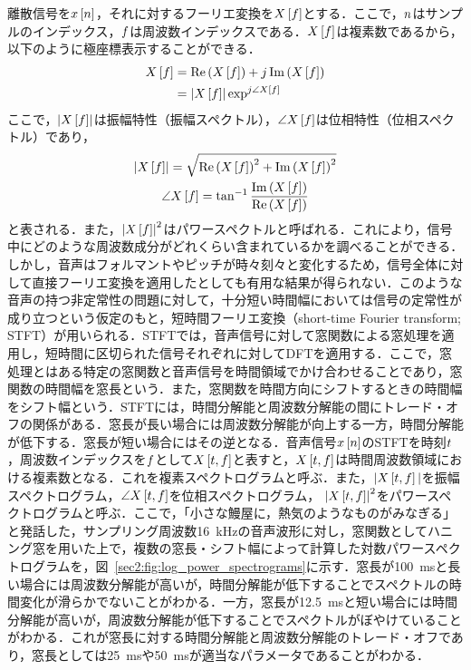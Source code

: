 離散信号を$x\left[n\right]$，それに対するフーリエ変換を$X\left[f\right]$とする．ここで，$n$はサンプルのインデックス，$f$は周波数インデックスである．$X\left[f\right]$は複素数であるから，以下のように極座標表示することができる．
\begin{align}
    X\left[f\right] & = \Re\left(X\left[f\right]\right) + j\Im\left(X\left[f\right]\right)    \\
                       & = \left|X\left[f\right]\right|\exp^{j\angle X\left[f\right]}
\end{align}
ここで，$\left|X\left[f\right]\right|$は振幅特性（振幅スペクトル），$\angle X\left[f\right]$は位相特性（位相スペクトル）であり，
\begin{gather}
    \left|X\left[f\right]\right| = \sqrt{\Re\left(X\left[f\right]\right)^{2} + \Im\left(X\left[f\right]\right)^{2}} \\
    \angle X\left[f\right] = \tan^{-1} \frac{\Im\left(X\left[f\right]\right)}{\Re\left(X\left[f\right]\right)}
\end{gather}
と表される．また，$\left|X\left[f\right]\right|^2$はパワースペクトルと呼ばれる．これにより，信号中にどのような周波数成分がどれくらい含まれているかを調べることができる．しかし，音声はフォルマントやピッチが時々刻々と変化するため，信号全体に対して直接フーリエ変換を適用したとしても有用な結果が得られない．このような音声の持つ非定常性の問題に対して，十分短い時間幅においては信号の定常性が成り立つという仮定のもと，短時間フーリエ変換（short-time Fourier transform; STFT）が用いられる．STFTでは，音声信号に対して窓関数による窓処理を適用し，短時間に区切られた信号それぞれに対してDFTを適用する．ここで，窓処理とはある特定の窓関数と音声信号を時間領域でかけ合わせることであり，窓関数の時間幅を窓長という．また，窓関数を時間方向にシフトするときの時間幅をシフト幅という．STFTには，時間分解能と周波数分解能の間にトレード・オフの関係がある．窓長が長い場合には周波数分解能が向上する一方，時間分解能が低下する．窓長が短い場合にはその逆となる．音声信号$x\left[n\right]$のSTFTを時刻$t$，周波数インデックスを$f$として$X\left[t, f\right]$と表すと，$X\left[t, f\right]$は時間周波数領域における複素数となる．これを複素スペクトログラムと呼ぶ．また，$|X\left[t, f\right]|$を振幅スペクトログラム，$\angle X\left[t, f\right]$を位相スペクトログラム，
$\left|X\left[t, f\right]\right|^{2}$をパワースペクトログラムと呼ぶ．ここで，「小さな鰻屋に，熱気のようなものがみなぎる」と発話した，サンプリング周波数\SI{16}{\kHz}の音声波形に対し，窓関数としてハニング窓を用いた上で，複数の窓長・シフト幅によって計算した対数パワースペクトログラムを，図~\ref{sec2:fig:log_power_spectrograms}に示す．窓長が\SI{100}{\ms}と長い場合には周波数分解能が高いが，時間分解能が低下することでスペクトルの時間変化が滑らかでないことがわかる．一方，窓長が\SI{12.5}{\ms}と短い場合には時間分解能が高いが，周波数分解能が低下することでスペクトルがぼやけていることがわかる．これが窓長に対する時間分解能と周波数分解能のトレード・オフであり，窓長としては\SI{25}{\ms}や\SI{50}{ms}が適当なパラメータであることがわかる．
